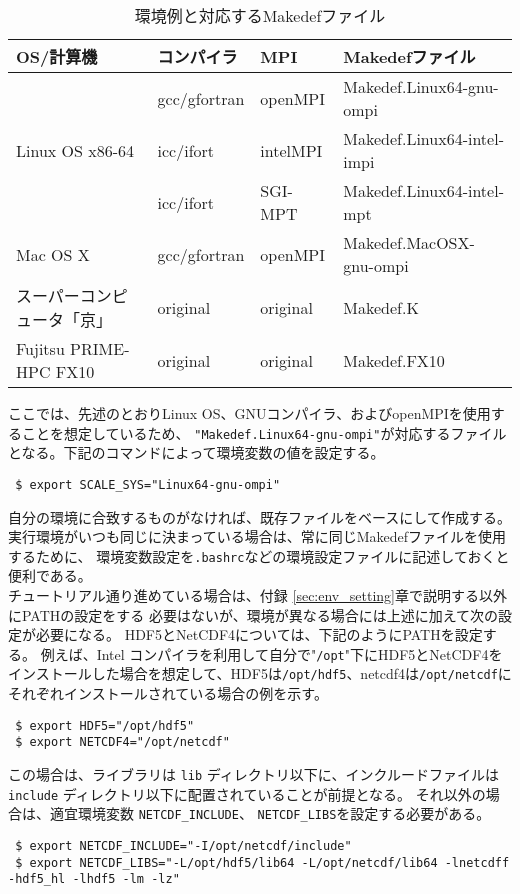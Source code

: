 \begin{table}[htb]
\begin{center}
\caption{環境例と対応するMakedefファイル}
\begin{tabularx}{150mm}{|l|l|X|l|} \hline
 \rowcolor[gray]{0.9} OS/計算機 & コンパイラ & MPI & Makedefファイル \\ \hline
              & gcc/gfortran & openMPI & Makedef.Linux64-gnu-ompi \\ \cline{2-4}
 Linux OS x86-64 & icc/ifort & intelMPI & Makedef.Linux64-intel-impi \\ \cline{2-4}
              & icc/ifort    & SGI-MPT & Makedef.Linux64-intel-mpt \\ \hline
 Mac OS X     & gcc/gfortran & openMPI & Makedef.MacOSX-gnu-ompi \\ \hline
 スーパーコンピュータ「京」 & original\footnotemark[1] & original\footnotemark[1] & Makedef.K \\ \hline
 Fujitsu PRIME-HPC FX10   & original\footnotemark[1] & original\footnotemark[1] & Makedef.FX10 \\ \hline
\end{tabularx}
\label{tab:makedef}
\end{center}
\end{table}

ここでは、先述のとおりLinux OS、GNUコンパイラ、およびopenMPIを使用することを想定しているため、
\verb|"Makedef.Linux64-gnu-ompi"|が対応するファイルとなる。下記のコマンドによって環境変数の値を設定する。
\begin{verbatim}
 $ export SCALE_SYS="Linux64-gnu-ompi"
\end{verbatim}
自分の環境に合致するものがなければ、既存ファイルをベースにして作成する。
実行環境がいつも同じに決まっている場合は、常に同じMakedefファイルを使用するために、
環境変数設定を\verb|.bashrc|などの環境設定ファイルに記述しておくと便利である。\\


チュートリアル通り進めている場合は、付録 \ref{sec:env_setting}章で説明する以外にPATHの設定をする
必要はないが、環境が異なる場合には上述に加えて次の設定が必要になる。
HDF5とNetCDF4については、下記のようにPATHを設定する。
例えば、Intel コンパイラを利用して自分で"\verb|/opt|"下にHDF5とNetCDF4を
インストールした場合を想定して、HDF5は\verb"/opt/hdf5"、netcdf4は\verb|/opt/netcdf|に
それぞれインストールされている場合の例を示す。
\begin{verbatim}
 $ export HDF5="/opt/hdf5"
 $ export NETCDF4="/opt/netcdf"
\end{verbatim}
この場合は、ライブラリは \verb|lib| ディレクトリ以下に、インクルードファイルは \verb|include| ディレクトリ以下に配置されていることが前提となる。
それ以外の場合は、適宜環境変数 \verb|NETCDF_INCLUDE|、 \verb|NETCDF_LIBS|を設定する必要がある。
\begin{verbatim}
 $ export NETCDF_INCLUDE="-I/opt/netcdf/include"
 $ export NETCDF_LIBS="-L/opt/hdf5/lib64 -L/opt/netcdf/lib64 -lnetcdff -hdf5_hl -lhdf5 -lm -lz"
\end{verbatim}


